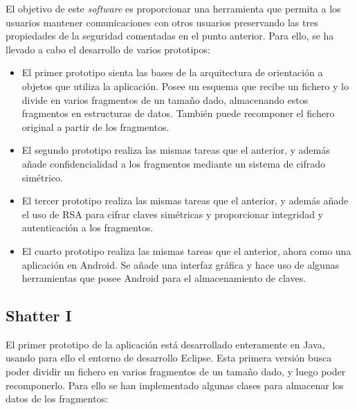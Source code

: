 El objetivo de este \emph{software} es proporcionar una herramienta que permita a los usuarios mantener comunicaciones con otros usuarios preservando las tres propiedades de la seguridad comentadas en el punto anterior. Para ello, se ha llevado a cabo el desarrollo de varios prototipos:

\begin{itemize}
  \item El primer prototipo sienta las bases de la arquitectura de orientación a objetos que utiliza la aplicación. Posee un esquema que recibe un fichero y lo divide en varios fragmentos de un tamaño dado, almacenando estos fragmentos en estructuras de datos. También puede recomponer el fichero original a partir de los fragmentos.

  \item El segundo prototipo realiza las mismas tareas que el anterior, y además añade confidencialidad a los fragmentos mediante un sistema de cifrado simétrico.

  \item El tercer prototipo realiza las mismas tareas que el anterior, y además añade el uso de RSA para cifrar claves simétricas y proporcionar integridad y autenticación a los fragmentos.

  \item El cuarto prototipo realiza las mismas tareas que el anterior, ahora como una aplicación en Android. Se añade una interfaz gráfica y hace uso de algunas herramientas que posee Android para el almacenamiento de claves.
\end{itemize}

\subsection{Shatter I}

El primer prototipo de la aplicación está desarrollado enteramente en Java, usando para ello el entorno de desarrollo Eclipse. Esta primera versión busca poder dividir un fichero en varios fragmentos de un tamaño dado, y luego poder recomponerlo. Para ello se han implementado algunas clases para almacenar los datos de los fragmentos:

